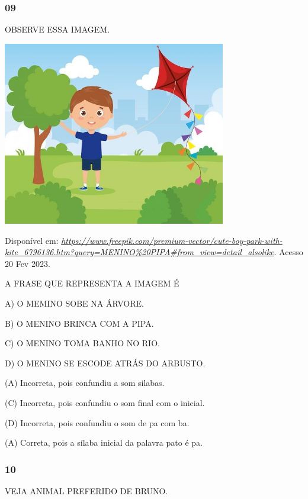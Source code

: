 \begin{escola}
\subsubsection{09 }\label{section-65}

OBSERVE ESSA IMAGEM.

\includegraphics[width=3.84043in,height=3.16853in]{media/image233.jpg}

Disponível em:
\href{https://www.freepik.com/premium-vector/cute-boy-park-with-kite_6796136.htm?query=MENINO\%20PIPA\#from_view=detail_alsolike}{\emph{https://www.freepik.com/premium-vector/cute-boy-park-with-kite\_6796136.htm?query=MENINO\%20PIPA\#from\_view=detail\_alsolike}}.
Acesso 20 Fev 2023.

A FRASE QUE REPRESENTA A IMAGEM É

A) O MEMINO SOBE NA ÁRVORE.

B) O MENINO BRINCA COM A PIPA.

C) O MENINO TOMA BANHO NO RIO.

D) O MENINO SE ESCODE ATRÁS DO ARBUSTO.

(A) Incorreta, pois confundiu a som silabas.

(C) Incorreta, pois confundiu o som final com o inicial.

(D) Incorreta, pois confundiu o som de pa com ba.

(A) Correta, pois a sílaba inicial da palavra pato é
pa.\protect\hypertarget{_heading=h.qmyrjsh4y5fg}{}{}

\subsubsection{10}\label{section-66}

VEJA ANIMAL PREFERIDO DE BRUNO.


\end{escola}

